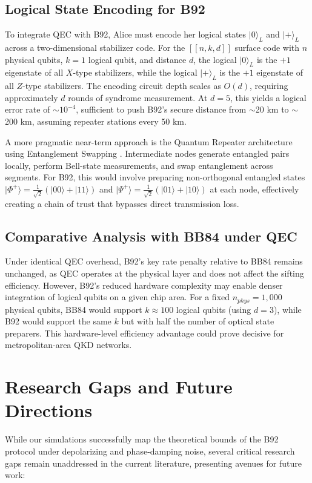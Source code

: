 \documentclass[conference]{IEEEtran}
\begin{document}
\subsection{Logical State Encoding for B92}
To integrate QEC with B92, Alice must encode her logical states $|0\rangle_L$ and $|+\rangle_L$ across a two-dimensional stabilizer code. For the $[[n,k,d]]$ surface code with $n$ physical qubits, $k=1$ logical qubit, and distance $d$, the logical $|0\rangle_L$ is the $+1$ eigenstate of all $X$-type stabilizers, while the logical $|+\rangle_L$ is the $+1$ eigenstate of all $Z$-type stabilizers. The encoding circuit depth scales as $O(d)$, requiring approximately $d$ rounds of syndrome measurement. At $d=5$, this yields a logical error rate of $\sim 10^{-4}$, sufficient to push B92's secure distance from $\sim$20 km to $\sim$200 km, assuming repeater stations every 50 km.

A more pragmatic near-term approach is the Quantum Repeater architecture using Entanglement Swapping \cite{briegel1998quantum}. Intermediate nodes generate entangled pairs locally, perform Bell-state measurements, and swap entanglement across segments. For B92, this would involve preparing non-orthogonal entangled states $|\Phi^+\rangle = \frac{1}{\sqrt{2}}(|00\rangle + |11\rangle)$ and $|\Psi^+\rangle = \frac{1}{\sqrt{2}}(|01\rangle + |10\rangle)$ at each node, effectively creating a chain of trust that bypasses direct transmission loss.

\subsection{Comparative Analysis with BB84 under QEC}
Under identical QEC overhead, B92's key rate penalty relative to BB84 remains unchanged, as QEC operates at the physical layer and does not affect the sifting efficiency. However, B92's reduced hardware complexity may enable denser integration of logical qubits on a given chip area. For a fixed $n_{phys} = 1,000$ physical qubits, BB84 would support $k \approx 100$ logical qubits (using $d=3$), while B92 would support the same $k$ but with half the number of optical state preparers. This hardware-level efficiency advantage could prove decisive for metropolitan-area QKD networks.

\section{Research Gaps and Future Directions}\label{sec:gaps}
While our simulations successfully map the theoretical bounds of the B92 protocol under depolarizing and phase-damping noise, several critical research gaps remain unaddressed in the current literature, presenting avenues for future work:
\end{document}
